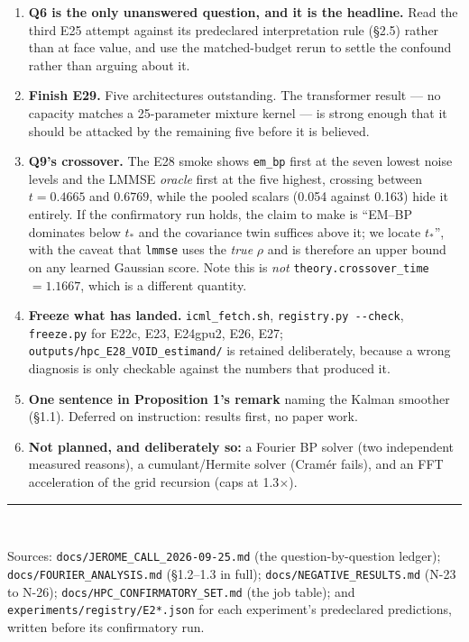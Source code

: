 \documentclass[10pt,a4paper]{article}
\newcommand{\corr}{\rho}
\newcommand{\code}[1]{\texttt{\small #1}}
\newcommand{\st}[1]{\textbf{#1}}
\begin{document}
\begin{enumerate}[leftmargin=1.3em,itemsep=0.18em]
\item \st{Q6 is the only unanswered question, and it is the headline.} Read the third E25
attempt against its predeclared interpretation rule (\S2.5) rather than at face value, and use
the matched-budget rerun to settle the confound rather than arguing about it.
\item \st{Finish E29.} Five architectures outstanding. The transformer result --- no capacity
matches a 25-parameter mixture kernel --- is strong enough that it should be attacked by the
remaining five before it is believed.
\item \st{Q9's crossover.} The E28 smoke shows \code{em\_bp} first at the seven lowest noise
levels and the LMMSE \emph{oracle} first at the five highest, crossing between $t=0.4665$ and
$0.6769$, while the pooled scalars (0.054 against 0.163) hide it entirely. If the confirmatory
run holds, the claim to make is ``EM--BP dominates below $t_*$ and the covariance twin suffices
above it; we locate $t_*$'', with the caveat that \code{lmmse} uses the \emph{true} $\corr$ and
is therefore an upper bound on any learned Gaussian score. Note this is \emph{not}
\code{theory.crossover\_time} $=1.1667$, which is a different quantity.
\item \st{Freeze what has landed.} \code{icml\_fetch.sh}, \code{registry.py -{}-check},
\code{freeze.py} for E22c, E23, E24gpu2, E26, E27; \code{outputs/hpc\_E28\_VOID\_estimand/} is
retained deliberately, because a wrong diagnosis is only checkable against the numbers that
produced it.
\item \st{One sentence in Proposition 1's remark} naming the Kalman smoother (\S1.1). Deferred on
instruction: results first, no paper work.
\item \st{Not planned, and deliberately so:} a Fourier BP solver (two independent measured
reasons), a cumulant/Hermite solver (Cramér fails), and an FFT acceleration of the grid
recursion (caps at 1.3$\times$).
\end{enumerate}

\bigskip
\noindent\rule{\textwidth}{0.4pt}\\[0.25em]
{\footnotesize\begin{sloppypar}\noindent Sources: \code{docs/JEROME\_CALL\_2026-09-25.md} (the question-by-question
ledger); \code{docs/FOURIER\_ANALYSIS.md} (\S1.2--1.3 in full);
\code{docs/NEGATIVE\_RESULTS.md} (N-23 to N-26); \code{docs/HPC\_CONFIRMATORY\_SET.md} (the job
table); and \code{experiments/registry/E2*.json} for each experiment's predeclared predictions,
written before its confirmatory run.\end{sloppypar}}
\end{document}

